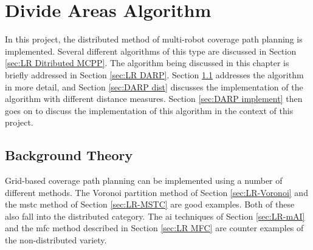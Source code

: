\chapter{Divide Areas Algorithm}
\label{chp:DARP}
In this project, the distributed method of multi-robot coverage path planning is implemented. Several different algorithms of this type are discussed in Section \ref{sec:LR Ditributed MCPP}. The algorithm being discussed in this chapter is briefly addressed in Section \ref{sec:LR DARP}. Section \ref{sec:DARP bg} addresses the algorithm in more detail, and Section \ref{sec:DARP dist} discusses the implementation of the algorithm with different distance measures. Section \ref{sec:DARP implement} then goes on to discuss the implementation of this algorithm in the context of this project.
\section{Background Theory}
\label{sec:DARP bg}
Grid-based coverage path planning can be implemented using a number of different methods. The Voronoi partition method of Section \ref{sec:LR-Voronoi} and the \acl{mstc} method of Section \ref{sec:LR-MSTC} are good examples. Both of these also fall into the distributed category. The \acl{ai} techniques of Section \ref{sec:LR-mAI} and the \acl{mfc} method described in Section \ref{sec:LR MFC} are counter examples of the non-distributed variety.

